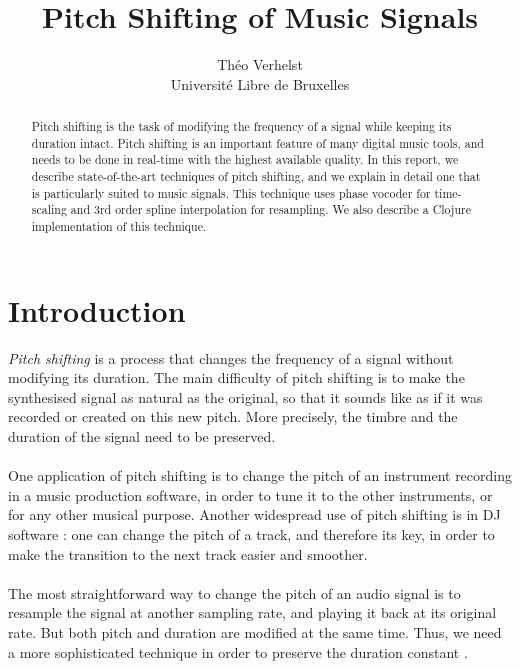 \documentclass[letterpaper]{article}
\title{Pitch Shifting of Music Signals}
\author{Théo Verhelst \\ Université Libre de Bruxelles}
\theoremstyle{definition}
\theoremstyle{remark}
\begin{document}
\maketitle

\begin{abstract}
Pitch shifting is the task of modifying the frequency of a signal while keeping
its duration intact. Pitch shifting is an important feature of many digital
music tools, and needs to be done in real-time with the highest available
quality. In this report, we describe state-of-the-art techniques of pitch
shifting, and we explain in detail one that is particularly suited to music
signals. This technique uses phase vocoder for time-scaling and 3rd order spline
interpolation for resampling. We also describe a Clojure implementation of this
technique.
\end{abstract}

\section{Introduction}
\emph{Pitch shifting} is a process that changes the frequency of a signal
without modifying its duration. The main difficulty of pitch shifting is to make
the synthesised signal as natural as the original, so that it sounds like as if
it was recorded or created on this new pitch. More precisely, the timbre and the
duration of the signal need to be preserved.

\paragraph{}
One application of pitch shifting is to change the pitch of an instrument
recording in a music production software, in order to tune it to the other
instruments, or for any other musical purpose. Another widespread use of pitch
shifting is in DJ software \citep{Cliff00hangthe}: one can change the pitch of a
track, and therefore its key, in order to make the transition to the next track
easier and smoother.

\paragraph{}
The most straightforward way to change the pitch of an audio signal is to
resample the signal at another sampling rate, and playing it back at its
original rate. But both pitch and duration are modified at the same time. Thus,
we need a more sophisticated technique in order to preserve the duration
constant \citep{DM}.
\end{document}
